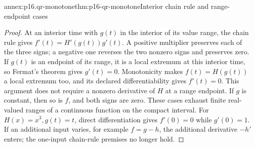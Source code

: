 \begin{annexitem}{annex:p16.qr-monotone}{thm:p16-qr-monotone}{Interior chain rule and range-endpoint cases}
\begin{proof}
At an interior time with \(g(t)\) in the interior of its value range,
the chain rule gives \(f'(t)=H'(g(t))g'(t)\). A positive multiplier
preserves each of the three signs; a negative one reverses the two nonzero
signs and preserves zero. If \(g(t)\) is an endpoint of its range, it
is a local extremum at this interior time, so Fermat's theorem gives
\(g'(t)=0\). Monotonicity makes \(f(t)=H(g(t))\) a local extremum
too, and its declared differentiability gives \(f'(t)=0\). This argument
does not require a nonzero derivative of \(H\) at a range endpoint.
If \(g\) is constant, then so is \(f\), and both signs are zero.
These cases exhaust finite real-valued ranges of a continuous function on
the compact interval. For \(H(x)=x^3,g(t)=t\), direct differentiation
gives \(f'(0)=0\) while \(g'(0)=1\). If an additional input varies,
for example \(f=g-h\), the additional derivative \(-h'\) enters;
the one-input chain-rule premises no longer hold.
\end{proof}
\end{annexitem}

